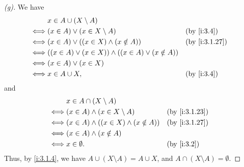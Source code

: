 \begin{proof}[(g)]
  We have
  \begin{align*}
         & x \in A \cup (X \setminus A)                                                      \\
    \iff & (x \in A) \lor (x \in X \setminus A)                           &  & \by{i:3.4}    \\
    \iff & (x \in A) \lor ((x \in X) \land (x \notin A))                  &  & \by{i:3.1.27} \\
    \iff & ((x \in A) \lor (x \in X)) \land ((x \in A) \lor (x \notin A))                    \\
    \iff & (x \in A) \lor (x \in X)                                                          \\
    \iff & x \in A \cup X,                                                &  & \by{i:3.4}
  \end{align*}
  and
  \begin{align*}
         & x \in A \cap (X \setminus A)                                      \\
    \iff & (x \in A) \land (x \in X \setminus A)          &  & \by{i:3.1.23} \\
    \iff & (x \in A) \land ((x \in X) \land (x \notin A)) &  & \by{i:3.1.27} \\
    \iff & (x \in A) \land (x \notin A)                                      \\
    \iff & x \in \emptyset.                               &  & \by{i:3.2}
  \end{align*}
  Thus, by \cref{i:3.1.4}, we have \(A \cup (X \setminus A) = A \cup X\), and \(A \cap (X \setminus A) = \emptyset\).
\end{proof}


